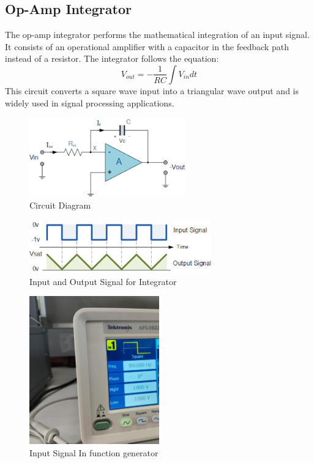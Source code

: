 \documentclass[a4paper,12pt]{article}
\begin{document}
\subsection{Op-Amp Integrator}
The op-amp integrator performs the mathematical integration of an input signal. It consists of an operational amplifier with a capacitor in the feedback path instead of a resistor. The integrator follows the equation:
\begin{equation}
    V_{out} = - \frac{1}{RC} \int V_{in} dt
\end{equation}
This circuit converts a square wave input into a triangular wave output and is widely used in signal processing applications.
\begin{figure}[H]
    \centering
    \includegraphics[width=0.6\textwidth]{figs/integratorcircuit.png}
    \caption{Circuit Diagram}
\end{figure}
\begin{figure}[H]
    \centering
    \includegraphics[width=0.7\textwidth]{figs/integrator_ideal.png}
    \caption{Input and Output Signal for Integrator}
\end{figure}
\begin{figure}[H]
    \centering
    \includegraphics[width=0.5\textwidth]{figs/integrator2.png}
    \caption{Input Signal In function generator}
\end{figure}
\end{document}

